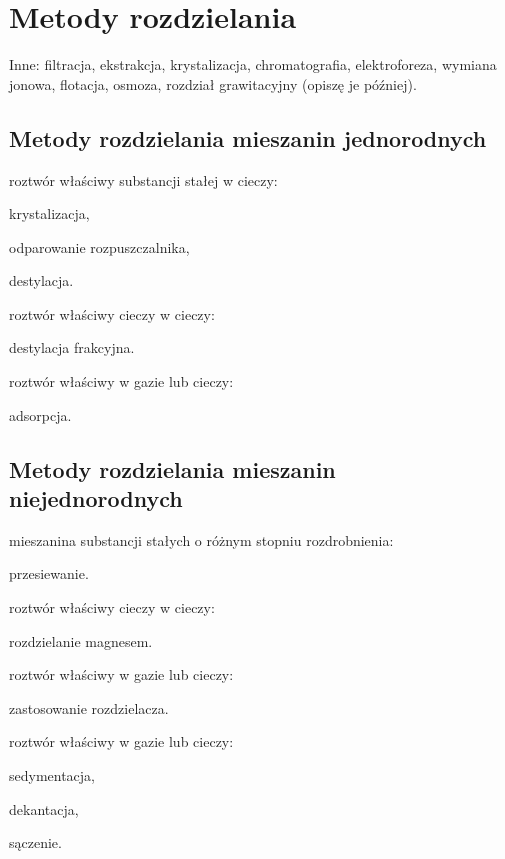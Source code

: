 
\section{Metody rozdzielania}
Inne:
filtracja, 
ekstrakcja,
krystalizacja, 
chromatografia, 
elektroforeza, 
wymiana jonowa, 
flotacja, 
osmoza, 
rozdział grawitacyjny (opiszę je później).

\subsection{Metody rozdzielania mieszanin jednorodnych}
\begin{compactitem}
\item roztwór właściwy substancji stałej w cieczy: \begin{compactitem}
	\item krystalizacja,
	\item odparowanie rozpuszczalnika,
	\item destylacja. %
\end{compactitem}
\item roztwór właściwy cieczy w cieczy: \begin{compactitem}
	\item destylacja frakcyjna.
\end{compactitem}
\item roztwór właściwy w gazie lub cieczy: \begin{compactitem}
	\item adsorpcja.
\end{compactitem}
\end{compactitem}

\subsection{Metody rozdzielania mieszanin niejednorodnych}
\begin{compactitem}
\item mieszanina substancji stałych o różnym stopniu rozdrobnienia: \begin{compactitem}
	\item przesiewanie.
\end{compactitem}
\item roztwór właściwy cieczy w cieczy: \begin{compactitem}
	\item rozdzielanie magnesem.
\end{compactitem}
\item roztwór właściwy w gazie lub cieczy: \begin{compactitem}
	\item zastosowanie rozdzielacza.
\end{compactitem}
\item roztwór właściwy w gazie lub cieczy: \begin{compactitem}
	\item sedymentacja,
	\item dekantacja,
	\item sączenie.
\end{compactitem}
\end{compactitem}